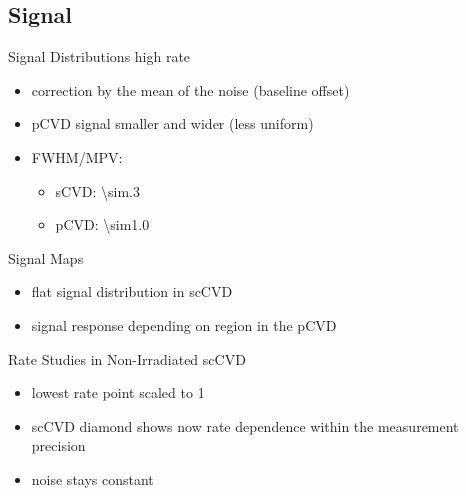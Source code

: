 \subsection{Signal}
\begin{frame}{Signal Distributions \@ high rate}
 
 \vspace*{-15pt}\vspace*{-10pt}

	\begin{itemize} \itemfill
		\item correction by the mean of the noise (baseline offset)
		\item pCVD signal smaller and wider (less uniform)
		\item FWHM/MPV:
		\begin{itemize}
			\item sCVD: \SI{\sim.3}{}
			\item pCVD: \SI{\sim1.0}{}
		\end{itemize}
	\end{itemize}
 
\end{frame}
\begin{frame}{Signal Maps}
	
	
	\begin{itemize} \itemfill
		\item flat signal distribution in scCVD
		\item signal response depending on region in the pCVD
	\end{itemize}
 
\end{frame}
\begin{frame}{Rate Studies in Non-Irradiated scCVD}

	
	
	\begin{itemize}\itemfill
		\item lowest rate point scaled to 1
		\item scCVD diamond shows now rate dependence within the measurement precision
		\item noise stays constant
	\end{itemize}
	
\end{frame}
